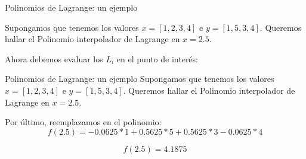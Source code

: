 \documentclass[xcolor=svgnames]{beamer} %
\theoremstyle{plain}
\theoremstyle{definition}
\begin{document}
\begin{frame}{Polinomios de Lagrange: un ejemplo}
 

  Supongamos que tenemos los valores $x =[1, 2, 3, 4]$  e $y= [1, 5, 3, 4]$.
  Queremos hallar el Polinomio interpolador de Lagrange en $x = 2.5$.
  
  Ahora debemos evaluar los $L_i$ en el punto de interés:
  
  \begin{minipage}{.45\linewidth}
  \begin{tiny}
  \end{tiny}
  \end{minipage}  \begin{minipage}{.45\linewidth}  
  \begin{tiny}
  \end{tiny}
  \end{minipage}
\end{frame}




\begin{frame}{Polinomios de Lagrange: un ejemplo}
  Supongamos que tenemos los valores $x =[1, 2, 3, 4]$  e $y= [1, 5, 3, 4]$.
  Queremos hallar el Polinomio interpolador de Lagrange en $x = 2.5$.
  
  Por último, reemplazamos en el polinomio:
  $$ f(2.5) = -0.0625*1 +0.5625*5 +0.5625*3-0.0625*4 $$
  \begin{tcolorbox}
    $$f(2.5) =  4.1875 $$
  \end{tcolorbox}
\end{frame}
\end{document}
